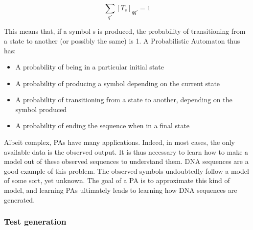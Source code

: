 \[
\sum_{q'}[T_{s}]_{qq'}=1
\]


This means that, if a symbol s is produced, the probability of transitioning
from a state to another (or possibly the same) is 1. A Probabilistic
Automaton thus has:
\begin{itemize}
\item A probability of being in a particular initial state
\item A probability of producing a symbol depending on the current state
\item A probability of transitioning from a state to another, depending
on the symbol produced
\item A probability of ending the sequence when in a final state
\end{itemize}
Albeit complex, PAs have many applications. Indeed, in most cases,
the only available data is the observed output. It is thus necessary
to learn how to make a model out of these observed sequences to understand
them. DNA sequences are a good example of this problem. The observed
symbols undoubtedly follow a model of some sort, yet unknown. The
goal of a PA is to approximate this kind of model, and learning PAs
ultimately leads to learning how DNA sequences are generated.


\subsubsection{Test generation}

